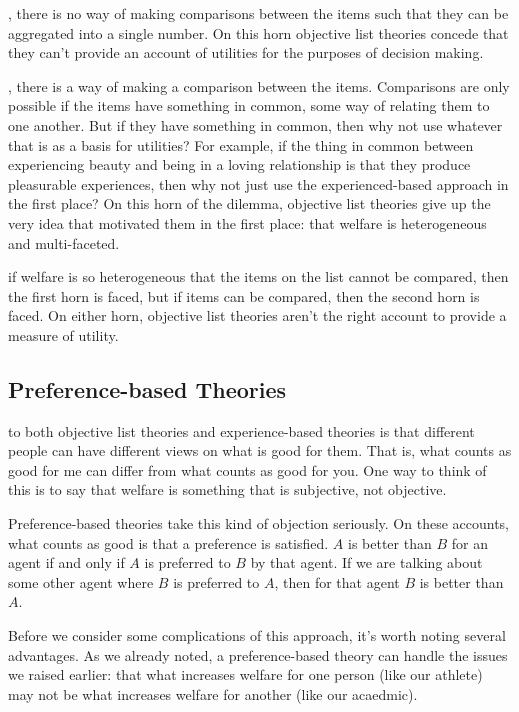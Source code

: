 \documentclass[]{tufte-book}
\begin{document}
, there is no way of making comparisons between the items such that they can be aggregated into a single number. On this horn objective list theories concede that they can't provide an account of utilities for the purposes of decision making.

, there is a way of making a comparison between the items. Comparisons are only possible if the items have something in common, some way of relating them to one another. But if they have something in common, then why not use whatever that is as a basis for utilities? For example, if the thing in common between experiencing beauty and being in a loving relationship is that they produce pleasurable experiences, then why not just use the experienced-based approach in the first place? On this horn of the dilemma, objective list theories give up the very idea that motivated them in the first place: that welfare is heterogeneous and multi-faceted.

 if welfare is so heterogeneous that the items on the list cannot be compared, then the first horn is faced, but if items can be compared, then the second horn is faced. On either horn, objective list theories aren't the right account to provide a measure of utility.

\hypertarget{preference-based-theories}{%
\subsection{Preference-based Theories}\label{preference-based-theories}}

 to both objective list theories and experience-based theories is that different people can have different views on what is good for them. That is, what counts as good for me can differ from what counts as good for you. One way to think of this is to say that welfare is something that is subjective, not objective.

Preference-based theories take this kind of objection seriously. On these accounts, what counts as good is that a preference is satisfied. \(A\) is better than \(B\) for an agent if and only if \(A\) is preferred to \(B\) by that agent. If we are talking about some other agent where \(B\) is preferred to \(A\), then for that agent \(B\) is better than \(A\).

Before we consider some complications of this approach, it's worth noting several advantages. As we already noted, a preference-based theory can handle the issues we raised earlier: that what increases welfare for one person (like our athlete) may not be what increases welfare for another (like our acaedmic).
\end{document}
